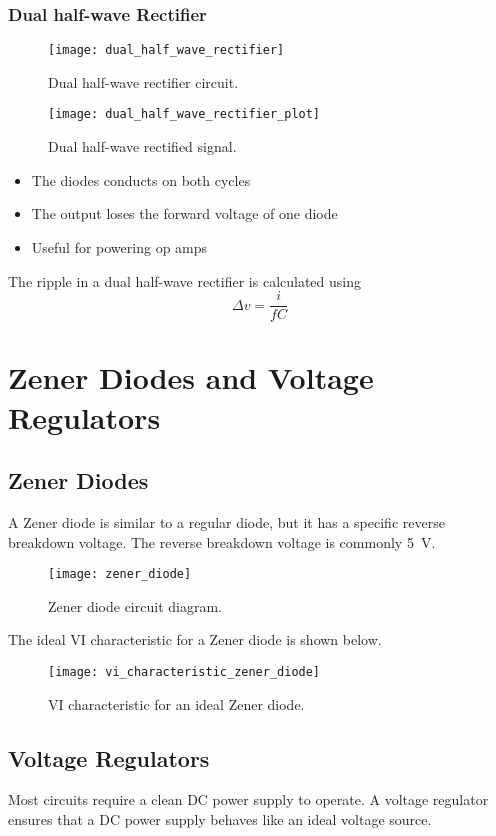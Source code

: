 \documentclass{article}
\begin{document}
\subsubsection{Dual half-wave Rectifier}
\begin{figure}[H]
    \centering
    \texttt{[image: dual\_half\_wave\_rectifier]}
    \caption{Dual half-wave rectifier circuit.}
\end{figure}
\begin{figure}[H]
    \centering
    \texttt{[image: dual\_half\_wave\_rectifier\_plot]}
    \caption{Dual half-wave rectified signal.}
\end{figure}
\begin{itemize}
    \item The diodes conducts on both cycles
    \item The output loses the forward voltage of one diode
    \item Useful for powering op amps
\end{itemize}
The ripple in a dual half-wave rectifier is calculated using
\begin{equation*}
    \Delta v = \frac{i}{fC}
\end{equation*}
\newpage
\section{Zener Diodes and Voltage Regulators}
\subsection{Zener Diodes}
A Zener diode is similar to a regular diode, but it has a specific
reverse breakdown voltage. The reverse breakdown voltage is commonly \SI{5}{\volt}.
\begin{figure}[H]
    \centering
    \texttt{[image: zener\_diode]}
    \caption{Zener diode circuit diagram.}
\end{figure}
The ideal VI characteristic for a Zener diode is shown below.
\begin{figure}[H]
    \centering
    \texttt{[image: vi\_characteristic\_zener\_diode]}
    \caption{VI characteristic for an ideal Zener diode.}
\end{figure}
\subsection{Voltage Regulators}
Most circuits require a clean DC power supply to operate.
A voltage regulator ensures that a DC power supply behaves like an ideal voltage source.
\end{document}
